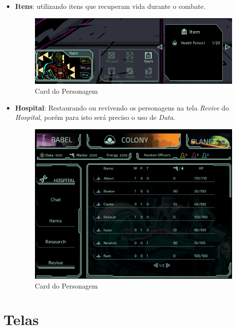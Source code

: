 \documentclass[11pt]{article} %
\begin{document}
\begin{itemize}
  \item \textbf{Itens}: utilizando itens que recuperam vida durante o combate.
    \begin{figure}[!htp]
    \centering
    \includegraphics[scale=0.35]{res/item_combat.png}
    \caption{Card do Personagem}
    \label{Card do Personagem}
    \end{figure}
    \newpage
  \item \textbf{Hospital}: Restaurando ou revivendo os personagens na tela \textit{Revive} do \textit{Hospital}, porém para isto será preciso o uso de \textit{Data}.
    \begin{figure}[!htp]
    \centering
    \includegraphics[scale=0.3]{res/revive.png}
    \caption{Card do Personagem}
    \label{Card do Personagem}
    \end{figure}
\end{itemize}

\section{Telas}
\end{document}
